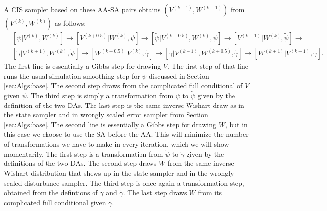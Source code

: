 \documentclass{article}
\begin{document}
A CIS sampler based on these AA-SA pairs obtains $(V^{(k+1)},W^{(k+1)})$ from $(V^{(k)},W^{(k)})$ as follows:
\begin{align*}
&[\psi|V^{(k)},W^{(k)}] \to [V^{(k+0.5)}|W^{(k)},\psi] \to [\tilde{\psi}|V^{(k+0.5)},W^{(k)},\psi] \to [V^{(k+1)}|W^{(k)},\tilde{\psi}]\to\\
&[\tilde{\gamma}|V^{(k+1)},W^{(k)},\tilde{\psi}] \to [W^{(k+0.5)}|V^{(k)},\tilde{\gamma}] \to [\gamma|V^{(k+1)},W^{(k+0.5)},\tilde{\gamma}]\to [W^{(k+1)}|V^{(k+1)},\gamma].
\end{align*}
The first line is essentially a Gibbs step for drawing $V$. The first step of that line runs the usual simulation smoothing step for $\psi$ discussed in Section \ref{sec:Algs:base}. The second step draws from the complicated full conditional of $V$ given $\psi$. The third step is simply a transformation from $\psi$ to $\tilde{\psi}$ given by the definition of the two DAs. The last step is the same inverse Wishart draw as in the state sampler and in wrongly scaled error sampler from Section \ref{sec:Algs:base}. The second line is essentially a Gibbs step for drawing $W$, but in this case we choose to use the SA before the AA. This will minimize the number of transformations we have to make in every iteration, which we will show momentarily. The first step is a transformation from $\tilde{\psi}$ to $\tilde{\gamma}$ given by the definitions of the two DAs. The second step draws $W$ from the same inverse Wishart distribution that shows up in the state sampler and in the wrongly scaled disturbance sampler. The third step is once again a transformation step, obtained from the defintions of $\gamma$ and $\tilde{\gamma}$.   The last step draws $W$ from its complicated full conditional given $\gamma$.
\end{document}

